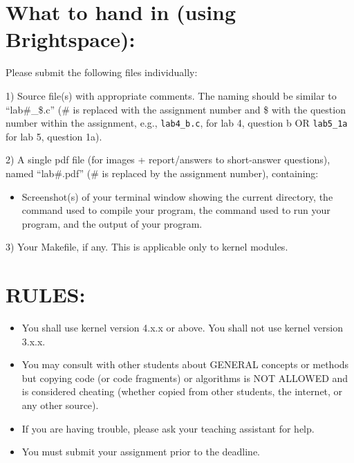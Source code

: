 \documentclass{article}
\begin{document}
\section*{What to hand in (using Brightspace): }

Please submit the following files individually:

1) Source file(s) with appropriate comments. The naming should be similar to “lab\#\_\$.c” (\# is replaced with the assignment number and \$ with the question number within the assignment, e.g., \texttt{lab4\_b.c}, for lab 4, question b OR \texttt{lab5\_1a} for lab 5, question 1a).

2) A single pdf file (for images + report/answers to short-answer questions), named “lab\#.pdf” (\# is replaced by the assignment number), containing:
    \begin{itemize}
        \item Screenshot(s) of your terminal window showing the current directory, the command used to compile your program, the command used to run your program, and the output of your program.
    \end{itemize}

3) Your Makefile, if any. This is applicable only to kernel modules.


\section*{RULES:}

\begin{itemize}
    \item You shall use kernel version 4.x.x or above. You shall not use kernel version 3.x.x.
    \item You may consult with other students about GENERAL concepts or methods but copying code (or code fragments) or algorithms is NOT ALLOWED and is considered cheating (whether copied from other students, the internet, or any other source).
    \item If you are having trouble, please ask your teaching assistant for help.
    \item You must submit your assignment prior to the deadline.
\end{itemize}

\end{document}
